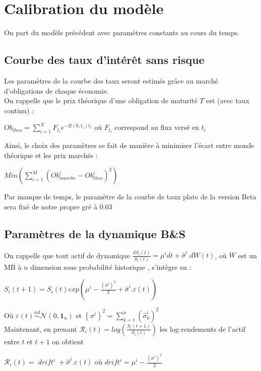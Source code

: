 \documentclass[a4paper,12pt]{article}
\begin{document}
\section{Calibration du modèle}
On part du modèle précédent avec paramètres constants au cours du temps.
\subsection{Courbe des taux d'intérêt sans risque}
Les paramètres de la courbe des taux seront estimés grâce au marché d'obligations de chaque économie. \\
On rappelle que le prix théorique d'une obligation de maturité $T$ est (avec taux continu) : 
\begin{center}
$Ob_{theo} = \sum\limits_{i=1}^NF_{t_i}e^{-R(0,t_i)t_i}$ où $F_{t_i}$ correspond au flux versé en $t_i$
\end{center}
Ainsi, le choix des paramètres se fait de manière à minimiser l'écart entre monde théorique et les prix marchés : 
\begin{center}
$Min\left(\sum\limits_{i=1}^M\left(Ob^i_{marche}-Ob^i_{theo}\right)^2\right)$
\end{center}
Par manque de temps, le paramètre de la courbe de taux plate de la version Beta sera fixé de notre propre gré à $0.03$
\subsection{Paramètres de la dynamique B\&S}
On rappelle que tout actif de dynamique $\frac{dS_i(t)}{S_i(t)}=\mu^i dt + \widehat{\sigma}^i.dW(t)$, où $W$ est un MB à $n$ dimension sous probabilité historique , s'intègre en : 
\begin{center}
$S_i(t+1)=S_i(t)exp\left(\mu^i-\frac{(\sigma^i)^2}{2}+\widehat{\sigma}^i.\varepsilon(t)\right)$
\end{center}
Où $\varepsilon(t)\overset{iid}{\sim}\mathcal{N}(0,\mathbf{1}_n)$ et $(\sigma^i)^2=\sum\limits_{k=1}^n(\widehat{\sigma}^i_k)^2$ \\[3mm]
Maintenant, en prenant $\mathcal{R}_i(t)=log\left(\frac{S_i(t+1)}{S_i(t)}\right)$ les log-rendements de l'actif entre $t$ et $t+1$ on obtient
\begin{center}
$\mathcal{R}_i(t)= \;drift^i\; + \widehat{\sigma}^i.\varepsilon(t)$ où $drift^i=\mu^i-\frac{(\sigma^i)^2}{2}$
\end{center}
\end{document}
